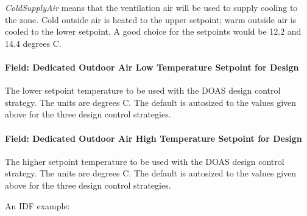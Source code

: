 \emph{ColdSupplyAir} means that the ventilation air will be used to supply cooling to the zone. Cold outside air is heated to the upper setpoint; warm outside air is cooled to the lower setpoint. A good choice for the setpoints would be 12.2 and 14.4 degrees C.

\paragraph{Field: Dedicated Outdoor Air Low Temperature Setpoint for Design}\label{field-dedicated-outdoor-air-low-temperatue-setpoint-for-design}

The lower setpoint temperature to be used with the DOAS design control strategy. The units are degrees C. The default is autosized to the values given above for the three design control strategies.

\paragraph{Field: Dedicated Outdoor Air High Temperature Setpoint for Design}\label{field-dedicated-outdoor-air-high-temperature-setpoint-for-design}

The higher setpoint temperature to be used with the DOAS design control strategy. The units are degrees C. The default is autosized to the values given above for the three design control strategies.

An IDF example:

